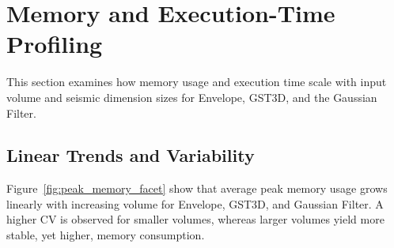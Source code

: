 \section{Memory and Execution-Time Profiling}
\label{sec:pmc-results-memory-and-execution-time-profiling}

This section examines how memory usage and execution time scale with input volume and seismic dimension sizes for Envelope, \ac{GST3D}, and the Gaussian Filter.

\subsection{Linear Trends and Variability}
\label{subsec:linear-trends-and-variability}

Figure~\ref{fig:peak_memory_facet} show that average peak memory usage grows linearly with increasing volume for Envelope, \ac{GST3D}, and Gaussian Filter.
A higher \ac{CV} is observed for smaller volumes, whereas larger volumes yield more stable, yet higher, memory consumption.

